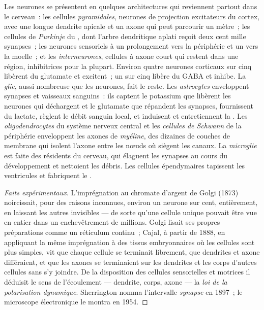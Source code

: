 \begin{definition}\label{def:b3:nervous-systems:cells}
Les neurones se présentent en quelques architectures qui reviennent
partout dans le cerveau~: les cellules \emph{pyramidales}, neurones de
projection excitateurs du cortex, avec une longue dendrite apicale et un
axone qui peut parcourir un mètre~; les cellules de \emph{Purkinje} du
, dont l'arbre dendritique aplati reçoit deux cent mille
synapses~; les neurones sensoriels à un prolongement vers la périphérie
et un vers la moelle~; et les \emph{interneurones}, cellules à axone
court qui restent dans une région, inhibitrices pour la plupart. Environ
quatre neurones corticaux sur cinq libèrent du glutamate et excitent~;
un sur cinq libère du GABA et inhibe. La \emph{glie}, aussi nombreuse
que les neurones, fait le reste. Les \emph{astrocytes} enveloppent
synapses et vaisseaux sanguins~: ils captent le potassium que libèrent
les neurones qui déchargent et le glutamate que répandent les synapses,
fournissent du lactate, règlent le débit sanguin local, et induisent et
entretiennent la . Les
\emph{oligodendrocytes} du système nerveux central et les \emph{cellules
de Schwann} de la périphérie enveloppent les axones de \emph{myéline},
des dizaines de couches de membrane qui isolent l'axone entre les nœuds
où siègent les canaux. La \emph{microglie} est faite des 
résidents du cerveau, qui élaguent les synapses au cours du
développement et nettoient les débris. Les cellules épendymaires
tapissent les ventricules et fabriquent le .
\end{definition}

\begin{proof}[Faits expérimentaux]
L'imprégnation au chromate d'argent de Golgi (1873) noircissait, pour
des raisons inconnues, environ un neurone sur cent, entièrement, en
laissant les autres invisibles --- de sorte qu'une cellule unique
pouvait être vue en entier dans un enchevêtrement de millions. Golgi
lisait ses propres préparations comme un réticulum continu~; Cajal, à
partir de 1888, en appliquant la même imprégnation à des tissus
embryonnaires où les cellules sont plus simples, vit que chaque cellule
se terminait librement, que dendrites et axone différaient, et que les
axones se terminaient sur les dendrites et les corps d'autres cellules
sans s'y joindre. De la disposition des cellules sensorielles et
motrices il déduisit le sens de l'écoulement --- dendrite, corps, axone
--- la \emph{loi de la polarisation dynamique}. Sherrington nomma
l'intervalle \emph{synapse} en 1897~; le microscope électronique le
montra en 1954.
\end{proof}

